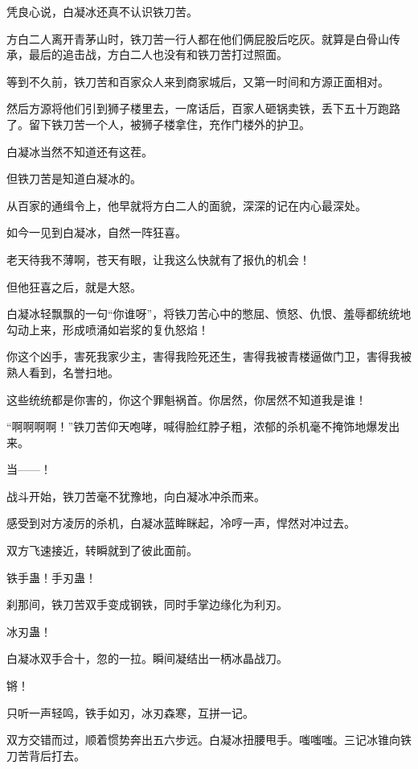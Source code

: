 
\begin{this_body}

凭良心说，白凝冰还真不认识铁刀苦。

方白二人离开青茅山时，铁刀苦一行人都在他们俩屁股后吃灰。就算是白骨山传承，最后的追击战，方白二人也没有和铁刀苦打过照面。

等到不久前，铁刀苦和百家众人来到商家城后，又第一时间和方源正面相对。

然后方源将他们引到狮子楼里去，一席话后，百家人砸锅卖铁，丢下五十万跑路了。留下铁刀苦一个人，被狮子楼拿住，充作门楼外的护卫。

白凝冰当然不知道还有这茬。

但铁刀苦是知道白凝冰的。

从百家的通缉令上，他早就将方白二人的面貌，深深的记在内心最深处。

如今一见到白凝冰，自然一阵狂喜。

老天待我不薄啊，苍天有眼，让我这么快就有了报仇的机会！

但他狂喜之后，就是大怒。

白凝冰轻飘飘的一句“你谁呀”，将铁刀苦心中的憋屈、愤怒、仇恨、羞辱都统统地勾动上来，形成喷涌如岩浆的复仇怒焰！

你这个凶手，害死我家少主，害得我险死还生，害得我被青楼逼做门卫，害得我被熟人看到，名誉扫地。

这些统统都是你害的，你这个罪魁祸首。你居然，你居然不知道我是谁！

“啊啊啊啊！”铁刀苦仰天咆哮，喊得脸红脖子粗，浓郁的杀机毫不掩饰地爆发出来。

当——！

战斗开始，铁刀苦毫不犹豫地，向白凝冰冲杀而来。

感受到对方凌厉的杀机，白凝冰蓝眸眯起，冷哼一声，悍然对冲过去。

双方飞速接近，转瞬就到了彼此面前。

铁手蛊！手刃蛊！

刹那间，铁刀苦双手变成钢铁，同时手掌边缘化为利刃。

冰刃蛊！

白凝冰双手合十，忽的一拉。瞬间凝结出一柄冰晶战刀。

锵！

只听一声轻鸣，铁手如刃，冰刃森寒，互拼一记。

双方交错而过，顺着惯势奔出五六步远。白凝冰扭腰甩手。嗤嗤嗤。三记冰锥向铁刀苦背后打去。


\end{this_body}
